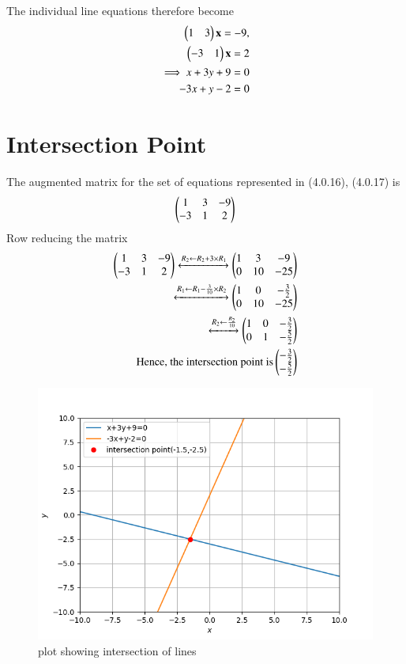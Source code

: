 \documentclass[journal,12pt,twocolumn]{IEEEtran}
\begin{document}
The individual line equations therefore become
\begin{align}
    \begin{pmatrix}1&3\end{pmatrix}\mathbf{x}=-9 ,\\\begin{pmatrix}-3&1\end{pmatrix}\mathbf{x}=2\\
    \implies 
    x+3y+9=0\\-3x+y-2=0
\end{align}
\section{Intersection Point}
The augmented matrix for the set of equations represented in (4.0.16), (4.0.17) is
\begin{align}
\begin{pmatrix}1&3&-9\\-3&1&2\end{pmatrix}
\end{align}
Row reducing the matrix
\begin{align}
 \begin{pmatrix}1&3&-9\\-3&1&2\end{pmatrix}\xleftrightarrow[]{R_2\leftarrow R_2+3\times R_1}\begin{pmatrix}1&3&-9\\0&10&-25\end{pmatrix}\\
 \xleftrightarrow[]{R_1\leftarrow R_1-\frac{3}{10}\times R_2}\begin{pmatrix}1&0&-\frac{3}{2}\\0&10&-25\end{pmatrix}\\
 \xleftrightarrow[]{R_2\leftarrow \frac{R_2}{10}}\begin{pmatrix}1&0&-\frac{3}{2}\\0&1&-\frac{5}{2}\end{pmatrix}\\
\text{Hence, the intersection point is}
\begin{pmatrix}-\frac{3}{2}\\-\frac{5}{2}\end{pmatrix}
\end{align}
\begin{figure}[!ht]
\centering
\includegraphics[width=\columnwidth]{hw4plot.png}
\caption{plot showing intersection of lines}
\label{Fig}
\end{figure}
\newpage
\end{document}
